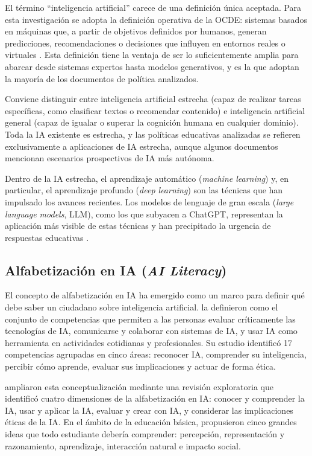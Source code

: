 El término ``inteligencia artificial'' carece de una definición única aceptada. Para esta investigación se adopta la definición operativa de la OCDE: sistemas basados en máquinas que, a partir de objetivos definidos por humanos, generan predicciones, recomendaciones o decisiones que influyen en entornos reales o virtuales \citep{oecd2019ai}. Esta definición tiene la ventaja de ser lo suficientemente amplia para abarcar desde sistemas expertos hasta modelos generativos, y es la que adoptan la mayoría de los documentos de política analizados.

Conviene distinguir entre inteligencia artificial estrecha (capaz de realizar tareas específicas, como clasificar textos o recomendar contenido) e inteligencia artificial general (capaz de igualar o superar la cognición humana en cualquier dominio). Toda la IA existente es estrecha, y las políticas educativas analizadas se refieren exclusivamente a aplicaciones de IA estrecha, aunque algunos documentos mencionan escenarios prospectivos de IA más autónoma.

Dentro de la IA estrecha, el aprendizaje automático (\textit{machine learning}) y, en particular, el aprendizaje profundo (\textit{deep learning}) son las técnicas que han impulsado los avances recientes. Los modelos de lenguaje de gran escala (\textit{large language models}, LLM), como los que subyacen a ChatGPT, representan la aplicación más visible de estas técnicas y han precipitado la urgencia de respuestas educativas \citep{unesco2023genai}.


\subsection{Alfabetización en IA (\textit{AI Literacy})}

El concepto de alfabetización en IA ha emergido como un marco para definir qué debe saber un ciudadano sobre inteligencia artificial. \citet{long2020ailiteracy} la definieron como el conjunto de competencias que permiten a las personas evaluar críticamente las tecnologías de IA, comunicarse y colaborar con sistemas de IA, y usar IA como herramienta en actividades cotidianas y profesionales. Su estudio identificó 17 competencias agrupadas en cinco áreas: reconocer IA, comprender su inteligencia, percibir cómo aprende, evaluar sus implicaciones y actuar de forma ética.

\citet{ng2021ailiteracy} ampliaron esta conceptualización mediante una revisión exploratoria que identificó cuatro dimensiones de la alfabetización en IA: conocer y comprender la IA, usar y aplicar la IA, evaluar y crear con IA, y considerar las implicaciones éticas de la IA. En el ámbito de la educación básica, \citet{touretzky2019k12ai} propusieron cinco grandes ideas que todo estudiante debería comprender: percepción, representación y razonamiento, aprendizaje, interacción natural e impacto social.

